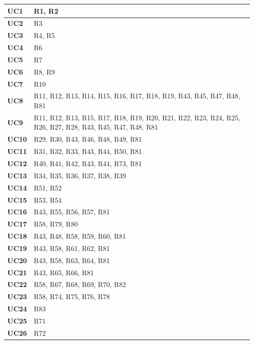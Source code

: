 \documentclass{Configuration_Files/PoliMi3i_thesis}
\begin{document}
\begin{table}[H]
    \begin{xltabular}{\textwidth}{| >{}l|X|}
    \hline
    \textbf{UC1} & R1, R2\T\B\\
    \hline
    \textbf{UC2} & R3\T\B\\
    \hline
    \textbf{UC3} & R4, R5 \T\B\\
    \hline
    \textbf{UC4} & R6\T\B\\
    \hline
    \textbf{UC5} & R7\T\B\\
    \hline
    \textbf{UC6} & R8, R9\T\B\\
    \hline
    \textbf{UC7} & R10\T\B\\
    \hline
    \textbf{UC8} & R11, R12, R13, R14, R15, R16, R17, R18, R19, R43, R45, R47, R48, R81\T\B\\
    \hline
    \textbf{UC9} & R11, R12, R13, R15, R17, R18, R19, R20, R21, R22, R23, R24, R25, R26, R27, R28, R43, R45, R47, R48, R81\T\B\\
    \hline
    \textbf{UC10} & R29, R30, R43, R46, R48, R49, R81\T\B\\
    \hline
    \textbf{UC11} & R31, R32, R33, R43, R44, R50, R81\T\B\\
    \hline
    \textbf{UC12} & R40, R41, R42, R43, R44, R73, R81\T\B\\
    \hline
    \textbf{UC13} & R34, R35, R36, R37, R38, R39\T\B\\
    \hline
    \textbf{UC14} & R51, R52\T\B\\
    \hline
    \textbf{UC15} & R53, R54\T\B\\
    \hline
    \textbf{UC16} & R43, R55, R56, R57, R81\T\B\\
    \hline
    \textbf{UC17} & R58, R79, R80\T\B\\
    \hline
    \textbf{UC18} & R43, R48, R58, R59, R60, R81\T\B\\
    \hline
    \textbf{UC19} & R43, R58, R61, R62, R81\T\B\\
    \hline
    \textbf{UC20} & R43, R58, R63, R64, R81\T\B\\
    \hline
    \textbf{UC21} & R43, R65, R66, R81\T\B\\
    \hline
    \textbf{UC22} & R58, R67, R68, R69, R70, R82\T\B\\
    \hline
    \textbf{UC23} & R58, R74, R75, R76, R78\T\B\\
    \hline
    \textbf{UC24} & R83\T\B\\
    \hline
    \textbf{UC25} & R71\T\B\\
    \hline
    \textbf{UC26} & R72\T\B\\
    \hline
    \end{xltabular}
\end{table}
\end{document}
